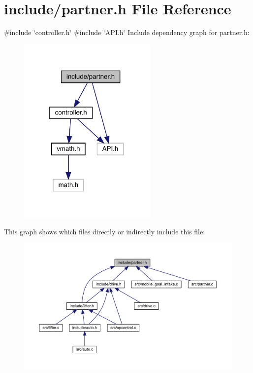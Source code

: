 \section{include/partner.h File Reference}
\label{partner_8h}
{\ttfamily \#include \char`\"{}controller.\+h\char`\"{}}\newline
{\ttfamily \#include \char`\"{}A\+P\+I.\+h\char`\"{}}\newline
Include dependency graph for partner.\+h\+:\nopagebreak
\begin{figure}[H]
\begin{center}
\leavevmode
\includegraphics[width=193pt]{partner_8h__incl}
\end{center}
\end{figure}
This graph shows which files directly or indirectly include this file\+:\nopagebreak
\begin{figure}[H]
\begin{center}
\leavevmode
\includegraphics[width=350pt]{partner_8h__dep__incl}
\end{center}
\end{figure}
